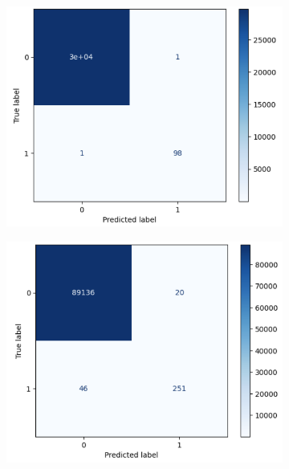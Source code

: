 \documentclass{article}
\begin{document}
\begin{figure}[ht]
    \begin{subfigure}[b]{0.36\textwidth}
        \includegraphics[width=\textwidth]{smot-rf-cm.png}
        \caption{}
        \label{fig:fig13}
    \end{subfigure}
    \begin{subfigure}[b]{0.36\textwidth}
        \includegraphics[width=\textwidth]{standard-xgboost-cm.png}
        \caption{}
        \label{fig:fig14}
    \end{subfigure}


\end{figure}
\end{document}
